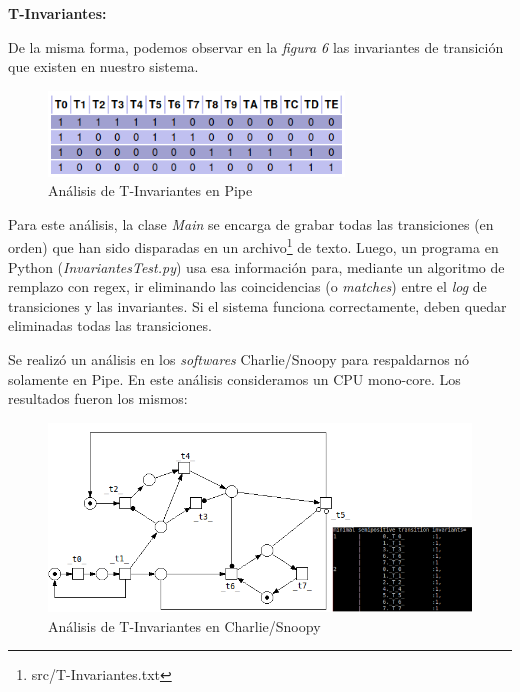 \documentclass{article}
\newcommand{\fninv}{src/T-Invariantes.txt}
\begin{document}
    \textbf{T-Invariantes:} \newline \par
    De la misma forma, podemos observar en la \emph{figura 6} las invariantes de transición
    que existen en nuestro sistema. \\
    \begin{figure}[H]
        \includegraphics[width=0.7\textwidth, center]{t-invariante.png}
        \caption{Análisis de T-Invariantes en Pipe}
    \end{figure}
    Para este análisis, la clase \emph{Main} se encarga de grabar todas las transiciones 
    (en orden) que han sido disparadas en un archivo\footnote{\fninv} de texto. Luego, un
    programa en Python (\emph{InvariantesTest.py}) usa esa información para, mediante un 
    algoritmo de remplazo con regex, ir eliminando las coincidencias (o \emph{matches}) 
    entre el \emph{log} de transiciones y las invariantes. Si el sistema funciona 
    correctamente, deben quedar eliminadas todas las transiciones. \newline \par
    Se realizó un análisis en los \emph{softwares} Charlie/Snoopy para respaldarnos nó 
    solamente en Pipe. En este análisis consideramos un CPU mono-core. Los resultados 
    fueron los mismos:
    \begin{figure}[H]
        \includegraphics[width=1.0\textwidth, center]{t-invariante-snoopy.png}
        \caption{Análisis de T-Invariantes en Charlie/Snoopy}
    \end{figure}
    \newpage
\end{document}
